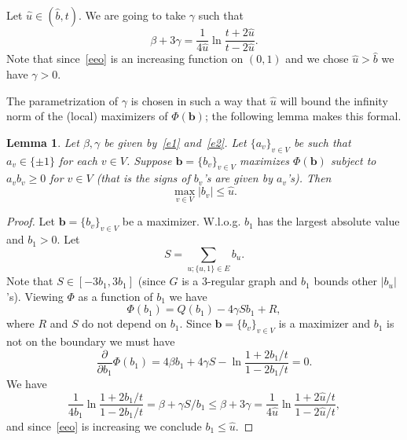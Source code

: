 \documentclass[11pt]{article}
\newtheorem{lemma}[theorem]{Lemma}
\begin{document}
Let $\hat{u}\in (\hat{b},t)$. We are going to take $\gamma$ such that
\begin{equation}\label{e2}
\beta + 3\gamma = \frac{1}{4\hat{u}}\ln \frac{t + 2\hat{u}}{t - 2\hat{u}}.
\end{equation}
Note that since~\eqref{eeo} is an increasing function on $(0,1)$ and we chose $\hat{u}>\hat{b}$ we have $\gamma>0$.

The parametrization of $\gamma$ is chosen in such a way that $\hat{u}$ will bound the infinity norm of the
(local) maximizers of $\Phi(\mathbf{b})$; the following lemma makes this formal.

\begin{lemma}\label{lo}
Let $\beta,\gamma$ be given by~\eqref{e1} and~\eqref{e2}. Let $\{a_v\}_{v\in V}$ be such that $a_v\in\{\pm 1\}$ for each $v\in V$. Suppose $\mathbf{b}=\{b_v\}_{v\in V}$ maximizes $\Phi(\mathbf{b})$ subject to $a_v b_v\geq 0$ for $v\in V$ (that is the signs of $b_v$'s are given by $a_v$'s).
Then
\begin{equation}\label{eupo}
\max_{v\in V} |b_v|\leq\hat{u}.
\end{equation}
\end{lemma}

\begin{proof}
Let $\mathbf{b}=\{b_v\}_{v\in V}$ be a maximizer.  W.l.o.g. $b_1$ has the largest absolute value and $b_1>0$. Let
\begin{equation}\label{ES}
S=\sum_{u; \{u,1\}\in E} b_u.
\end{equation}
Note that $S\in [-3b_1,3b_1]$ (since $G$ is a $3$-regular graph and $b_1$ bounds other $|b_u|$'s). Viewing $\Phi$ as a function of $b_1$ we have
\begin{equation}\label{PB1}
\Phi(b_1) = Q(b_1) - 4\gamma S b_1 + R,
\end{equation}
where $R$ and $S$ do not depend on $b_1$. Since $\mathbf{b}=\{b_v\}_{v\in V}$ is a maximizer and $b_1$ is not on the boundary
we must have
\begin{equation}\label{PB1de}
\frac{\partial}{\partial b_1} \Phi(b_1)  = 4\beta b_1 + 4\gamma S - \ln\frac{1+2b_1/t}{1-2b_1/t} = 0.
\end{equation}
We have
$$
\frac{1}{4 b_1} \ln\frac{1+2b_1/t}{1-2b_1/t} = \beta + \gamma S/b_1 \leq \beta + 3\gamma = \frac{1}{4\hat{u}}\ln \frac{1 + 2\hat{u}/t}{1 - 2\hat{u}/t},
$$
and since~\eqref{eeo} is increasing we conclude $b_1\leq\hat{u}$. 
\end{proof}
\end{document}
